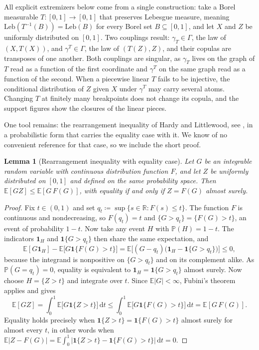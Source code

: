 \documentclass[11pt,a4paper]{article}
\newtheorem{lemma}[theorem]{Lemma}
\theoremstyle{remark}
\newcommand{\E}{\mathbb{E}}
\newcommand{\Prob}{\mathbb{P}}
\newcommand{\R}{\mathbb{R}}
\newcommand{\de}{\,\mathrm{d}}
\newcommand{\1}{\mathbf{1}}
\newcommand{\Gam}{\Gamma}
\begin{document}
All explicit extremizers below come from a single construction: take a Borel measurable $T:[0,1]\to[0,1]$ that preserves Lebesgue measure, meaning $\mathrm{Leb}(T^{-1}(B))=\mathrm{Leb}(B)$ for every Borel set $B\subseteq[0,1]$, and let $X$ and $Z$ be uniformly distributed on $[0,1]$.
Two couplings result: $\gamma_T\in\Gam$, the law of $(X,T(X))$, and $\gamma^T\in\Gam$, the law of $(T(Z),Z)$, and their copulas are transposes of one another.
Both couplings are singular, as $\gamma_T$ lives on the graph of $T$ read as a function of the first coordinate and $\gamma^T$ on the same graph read as a function of the second.
When a piecewise linear $T$ fails to be injective, the conditional distribution of $Z$ given $X$ under $\gamma^T$ may carry several atoms.
Changing $T$ at finitely many breakpoints does not change its copula, and the support figures show the closures of the linear pieces.

One tool remains: the rearrangement inequality of Hardy and Littlewood, see \cite[Ch.~X]{hardy1952inequalities}, in a probabilistic form that carries the equality case with it.
We know of no convenient reference for that case, so we include the short proof.

\begin{lemma}[Rearrangement inequality with equality case]
\label{lem:rearrangement}
Let $G$ be an integrable random variable with continuous distribution function $F$, and let $Z$ be uniformly distributed on $[0,1]$ and defined on the same probability space.
Then $\E[GZ]\le\E[G\,F(G)]$, with equality if and only if $Z=F(G)$ almost surely.
\end{lemma}

\begin{proof}
Fix $t\in(0,1)$ and set $q_t\coloneqq\sup\{s\in\R:F(s)\le t\}$.
The function $F$ is continuous and nondecreasing, so $F(q_t)=t$ and $\{G>q_t\}=\{F(G)>t\}$, an event of probability $1-t$.
Now take any event $H$ with $\Prob(H)=1-t$.
The indicators $\1_H$ and $\1\{G>q_t\}$ then share the same expectation, and
\[
  \E[G\1_H]-\E\bigl[G\1\{F(G)>t\}\bigr]
  =\E\bigl[(G-q_t)\bigl(\1_H-\1\{G>q_t\}\bigr)\bigr]
  \le0,
\]
because the integrand is nonpositive on $\{G>q_t\}$ and on its complement alike.
As $\Prob(G=q_t)=0$, equality is equivalent to $\1_H=\1\{G>q_t\}$ almost surely.
Now choose $H=\{Z>t\}$ and integrate over $t$.
Since $\E|G|<\infty$, Fubini's theorem applies and gives
\[
  \E[GZ]=\int_0^1\E\bigl[G\1\{Z>t\}\bigr]\de t
  \le\int_0^1\E\bigl[G\1\{F(G)>t\}\bigr]\de t
  =\E[G\,F(G)].
\]
Equality holds precisely when $\1\{Z>t\}=\1\{F(G)>t\}$ almost surely for almost every $t$, in other words when $\E|Z-F(G)|=\E\int_0^1|\1\{Z>t\}-\1\{F(G)>t\}|\de t=0$.
\end{proof}
\end{document}
